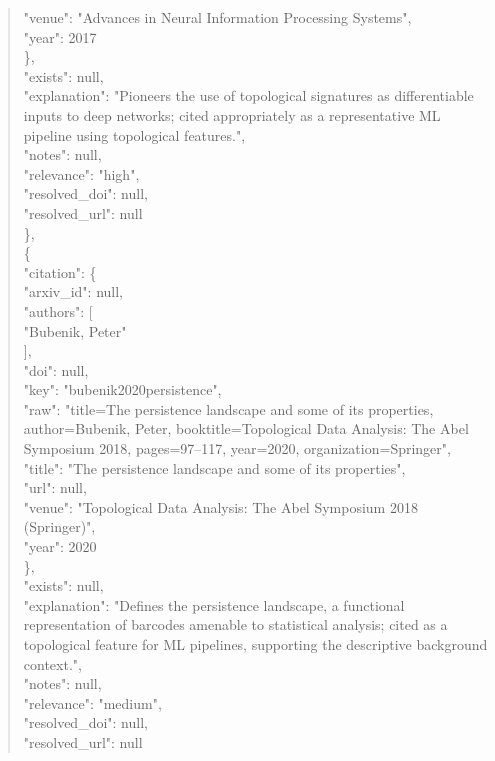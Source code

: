 \documentclass[11pt]{article}
\begin{document}
\begin{quote}
        "venue": "Advances in Neural Information Processing Systems",\\
        "year": 2017\\
      \},\\
      "exists": null,\\
      "explanation": "Pioneers the use of topological signatures as differentiable inputs to deep networks; cited appropriately as a representative ML pipeline using topological features.",\\
      "notes": null,\\
      "relevance": "high",\\
      "resolved\_doi": null,\\
      "resolved\_url": null\\
    \},\\
    \{\\
      "citation": \{\\
        "arxiv\_id": null,\\
        "authors": [\\
          "Bubenik, Peter"\\
        ],\\
        "doi": null,\\
        "key": "bubenik2020persistence",\\
        "raw": "title=The persistence landscape and some of its properties, author=Bubenik, Peter, booktitle=Topological Data Analysis: The Abel Symposium 2018, pages=97--117, year=2020, organization=Springer",\\
        "title": "The persistence landscape and some of its properties",\\
        "url": null,\\
        "venue": "Topological Data Analysis: The Abel Symposium 2018 (Springer)",\\
        "year": 2020\\
      \},\\
      "exists": null,\\
      "explanation": "Defines the persistence landscape, a functional representation of barcodes amenable to statistical analysis; cited as a topological feature for ML pipelines, supporting the descriptive background context.",\\
      "notes": null,\\
      "relevance": "medium",\\
      "resolved\_doi": null,\\
      "resolved\_url": null\\

\end{quote}
\end{document}
